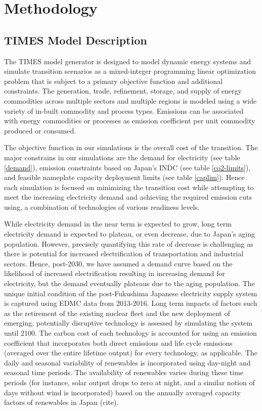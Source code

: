 \section{Methodology} \label{method}
\subsection{TIMES Model Description}
The \gls{TIMES} model generator is designed to model dynamic energy systems and simulate transition scenarios as a mixed-integer programming linear optimization problem that is subject to a primary objective function and additional constraints. The generation, trade, refinement, storage, and supply of energy commodities across multiple sectors and multiple regions is modeled using a wide variety of in-built commodity and process types. Emissions can be associated with energy commodities or processes as emission coefficient per unit commodity produced or consumed. 

The objective function in our simulations is the overall cost of the transition. The major constrains in our simulations are the demand for electricity (see table \ref{demand}), emission constraints based on Japan's \gls{INDC} (see table \ref{co2-limits}), and feasible nameplate capacity deployment limits (see table \ref{caplim}). Hence each simulation is focused on minimizing the transition cost while attempting to meet the increasing electricity demand and achieving the required emission cuts using, a combination of technologies of various readiness levels. 

While electricity demand in the near term is expected to grow, long term electricity demand is expected to plateau, or even decrease, due to Japan's aging population. However, precisely quantifying this rate of decrease is challenging as there is potential for increased electrification of  transportation and industrial sectors. Hence, post-2030, we have assumed a demand curve based on the likelihood of increased electrification resulting in increasing demand for electricity, but the demand eventually plateaus due to the aging population. The unique initial condition of the post-Fukushima Japanese electricity supply system is captured using \gls{EDMC} data from 2013-2016. Long term impacts of factors such as the retirement of the existing nuclear fleet and the new deployment of emerging, potentially disruptive technology is assessed by simulating the system until 2100. The carbon cost of each technology is accounted for using an emission coefficient that incorporates both direct emissions and life cycle emissions (averaged over the entire lifetime output) for every technology, as applicable. The daily and seasonal variability of renewables is incorporated using day-night and seasonal time periods. The availability of renewables varies during these time periods (for instance, solar output drops to zero at night, and a similar notion of days without wind is incorporated) based on the annually averaged capacity factors of renewables in Japan (cite).

